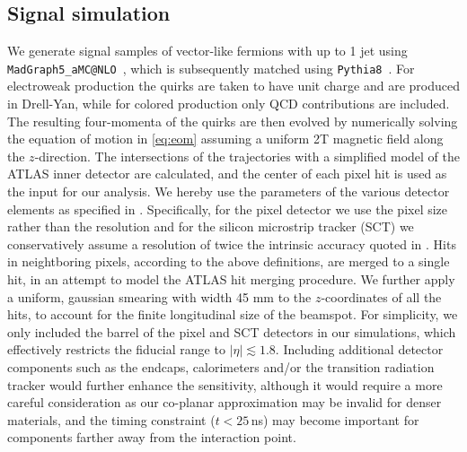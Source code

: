 \documentclass[10pt,aps,prd,nofootinbib,superscriptaddress,twocolumn,preprintnumbers,balancelastpage]{revtex4}
\newcommand{\SK}[1]{\textcolor{ForestGreen}{ SK: #1}}
\begin{document}
\subsection{Signal simulation\label{sec:simulation}}

We generate signal samples of vector-like fermions with up to 1 jet using \texttt{MadGraph5\_aMC@NLO}~\cite{Alwall:2014hca, Buchkremer:2013bha}, which is subsequently matched using \texttt{Pythia8}~\cite{Sjostrand:2006za,Sjostrand:2014zea}. For electroweak production the quirks are taken to have unit charge and are produced in Drell-Yan, while for colored production only QCD contributions are included. The resulting four-momenta of the quirks are then evolved by numerically solving the equation of motion in \eqref{eq:eom} assuming a uniform 2T magnetic field along the $z$-direction. The intersections of the trajectories with a simplified model of the ATLAS inner detector are calculated, and the center of each pixel hit is used as the input for our analysis. We hereby use the parameters of the various detector elements as specified in \cite{ATL-PHYS-PUB-2009-002}. Specifically, for the pixel detector we use the pixel size rather than the resolution and for the silicon microstrip tracker (SCT) we conservatively assume a resolution of twice the intrinsic accuracy quoted in \cite{ATL-PHYS-PUB-2009-002}. Hits in neightboring pixels, according to the above definitions, are merged to a single hit, in an attempt to model the ATLAS hit merging procedure. We further apply a uniform, gaussian smearing with width 45 mm to the $z$-coordinates of all the hits, to account for the finite longitudinal size of the beamspot. For simplicity, we only included the barrel of the pixel and SCT detectors in our simulations, which effectively restricts the fiducial range to $|\eta|\lesssim1.8$. Including additional detector components such as the endcaps, calorimeters and/or the transition radiation tracker would further enhance the sensitivity, although it would require a more careful consideration as our co-planar approximation may be invalid for denser materials, and the timing constraint ($t < 25 \, $ns) may become important for components farther away from the interaction point. 

\end{document}
